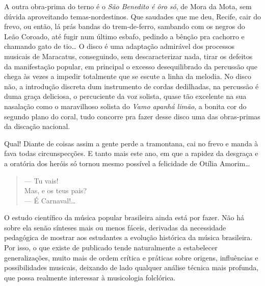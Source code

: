 A outra obra-prima do terno é o \emph{São Benedito é ôro só}, de Mora da
Mota, sem dúvida aproveitando temas-nordestinos. Que saudades que me
deu, Recife, cair do frevo, ou então, lá prás bandas do trem-de-ferro,
sambando com os negros do Leão Coroado, até fugir num último esbafo,
pedindo a bênção pra cachorro e chamando gato de tio\ldots{} O disco é uma
adaptação admirável dos processos musicais de Maracatus, conseguindo,
sem descaracterizar nada, tirar os defeitos da manifestação popular, em
principal o excesso desequilibrado da percussão que chega às vezes a
impedir totalmente que se escute a linha da melodia. No disco não, a
introdução discreta dum instrumento de cordas dedilhadas, na percussão é
duma graça deliciosa, o percuciente da voz solista, quase tão excelente
na sua nasalação como o maravilhoso solista do \emph{Vamo apanhá limão},
a bonita cor do segundo plano do coral, tudo concorre pra fazer desse
disco uma das obras-primas da discação nacional.

Qual! Diante de coisas assim a gente perde a tramontana, cai no frevo e
manda à fava todas circunspecções. E tanto mais este ano, em que a
rapidez da desgraça e a oratória dos heróis só tornou mesmo possível a
felicidade de Otília Amorim\ldots{}

\begin{verse}
--- Tu vais!\\
Mas, e os teus pais?\\
--- É Carnaval!\ldots{}
\end{verse}




O estudo científico da música popular brasileira ainda está por fazer.
Não há sobre ela senão sínteses mais ou menos fáceis, derivadas da
necessidade pedagógica de mostrar aos estudantes a evolução histórica da
música brasileira. Por isso, o que existe de publicado tende
naturalmente a estabelecer generalizações, muito mais de ordem crítica e
práticas sobre origens, influências e possibilidades musicais, deixando
de lado qualquer análise técnica mais profunda, que possa realmente
interessar à musicologia folclórica.


